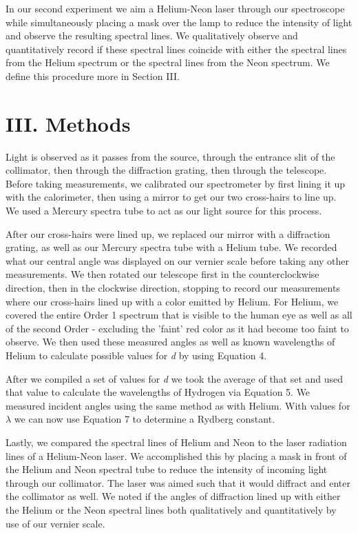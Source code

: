 \documentclass{article}
\begin{document}
In our second experiment we aim a Helium-Neon laser through our spectroscope while simultaneously placing a mask over the lamp to reduce the intensity of light and observe the resulting spectral lines. We qualitatively observe and quantitatively record if these spectral lines coincide with either the spectral lines from the Helium spectrum or the spectral lines from the Neon spectrum. We define this procedure more in Section III.
\section*{III. Methods}
\indent \indent Light is observed as it passes from the source, through the entrance slit of the collimator, then through the diffraction grating, then through the telescope. Before taking measurements, we calibrated our spectrometer by first lining it up with the calorimeter, then using a mirror to get our two cross-hairs to line up. We used a Mercury spectra tube to act as our light source for this process.

After our cross-hairs were lined up, we replaced our mirror with a diffraction grating, as well as our Mercury spectra tube with a Helium tube. We recorded what our central angle was displayed on our vernier scale before taking any other measurements. We then rotated our telescope first in the counterclockwise direction, then in the clockwise direction, stopping to record our measurements where our cross-hairs lined up with a color emitted by Helium. For Helium, we covered the entire Order 1 spectrum that is visible to the human eye as well as all of the second Order - excluding the 'faint' red color as it had become too faint to observe. We then used these measured angles as well as known wavelengths of Helium to calculate possible values for \textit{d} by using Equation 4.

After we compiled a set of values for \textit{d} we took the average of that set and used that value to calculate the wavelengths of Hydrogen via Equation 5. We measured incident angles using the same method as with Helium. With values for \textit{$\lambda$} we can now use Equation 7 to determine a Rydberg constant.

Lastly, we compared the spectral lines of Helium and Neon to the laser radiation lines of a Helium-Neon laser. We accomplished this by placing a mask in front of the Helium and Neon spectral tube to reduce the intensity of incoming light through our collimator. The laser was aimed such that it would diffract and enter the collimator as well. We noted if the angles of diffraction lined up with either the Helium or the Neon spectral lines both qualitatively and quantitatively by use of our vernier scale.
\end{document}
